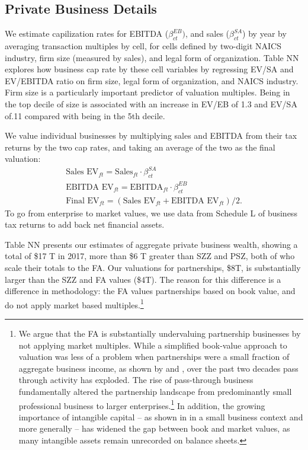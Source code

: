 \documentclass[12pt]{article}
\begin{document}
\subsection{Private Business Details}



We estimate capilization rates for EBITDA ($\beta_{ct}^{EB})$, and sales ($\beta_{ct}^{SA}$) by year by averaging transaction multiples by cell, for cells defined by two-digit NAICS industry, firm size (measured by sales), and legal form of organization. Table NN explores how business cap rate by these cell variables by regressing EV/SA and EV/EBITDA ratio on firm size, legal form of organization, and NAICS industry.  Firm size is a particularly important predictor of valuation multiples. Being in the top decile of size is associated with an increase in EV/EB of 1.3 and EV/SA of.11 compared with being in the 5th decile. 

We value individual businesses by multiplying sales and EBITDA from their tax returns by the two cap rates, and taking an average of the two as the final valuation:
\begin{align}
\text{Sales EV}_{ft} = \text{Sales}_{ft} \cdot \beta_{ct}^{SA}  \label{eq:sav} \\
\text{EBITDA EV}_{ft} =   \text{EBITDA}_{ft} \cdot \beta_{ct}^{EB}  \label{eq:ebv}\\
\text{Final EV}_{ft} = (\text{Sales EV}_{ft} + \text{EBITDA EV}_{ft}) / 2.
\end{align}
To go from enterprise to market values, we use data from Schedule L of business tax returns to add back net financial assets. 

Table NN presents our estimates of aggregate private business wealth, showing a total of \$17 T in 2017, more than \$6 T greater than SZZ and PSZ, both of who scale their totals to the FA. Our valuations for partnerships, \$8T, is substantially larger than the SZZ and FA values (\$4T). The reason for this difference is a difference in methodology: the FA values partnerships based on book value, and do not apply market based multiples.\footnote{We argue that the FA is substantially undervaluing partnership businesses by not applying market multiples. While a simplified book-value approach to valuation was less of a problem when partnerships were a small fraction of aggregate business income, as shown by \citet{smith2019capitalists} and \citet{smith2022rise}, over the past two decades pass through activity has exploded. The rise of pass-through business fundamentally altered the partnership landscape from predominantly small professional business to larger enterprises.\footnote{See \citet{chrisman2009llcs} and \citet{friedman2004silent}.} In addition, the growing importance of intangible capital -- as shown in \citet{bhandari2021sweat} in a small business context and \citet{corrado2009intangible} more generally -- has widened the gap between book and market values, as many intangible assets remain unrecorded on balance sheets.} 
\end{document}
